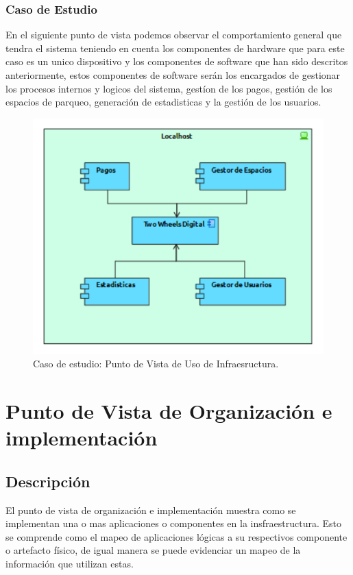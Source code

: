 \subsubsection{Caso de Estudio}
En el siguiente punto de vista podemos observar el comportamiento general que tendra el sistema teniendo en cuenta los componentes de hardware que para este caso es un unico dispositivo y los componentes de software que han sido descritos anteriormente, estos componentes de software serán los encargados de gestionar los procesos internos y logicos del sistema, gestíon de los pagos, gestión de los espacios de parqueo, generación de estadisticas y la gestión de los usuarios.
\begin{figure}[H]
	\centering
	\includegraphics[width=1.0\textwidth]{imagenes/Caso_Estudio/Tecnologia/uso_infraestructura.PDF}
	\caption{Caso de estudio: Punto de Vista de Uso de Infraesructura.}
	\label{fig:gap_analysis}
\end{figure}


\section{Punto de Vista de Organización e implementación}
\subsection{Descripción}
El punto de vista de organización e implementación muestra como se implementan una o mas aplicaciones o componentes en la insfraestructura. Esto se comprende como el mapeo de aplicaciones lógicas a su respectivos componente o artefacto físico, de igual manera se puede evidenciar un mapeo de  la información que utilizan estas.

